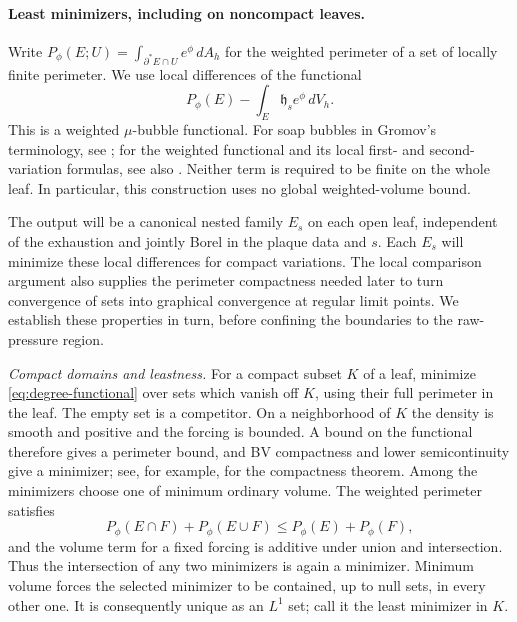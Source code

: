 \paragraph{Least minimizers, including on noncompact leaves.}
Write $P_\phi(E;U)=\int_{\partial^*E\cap U}e^\phi\,dA_h$ for the weighted
perimeter of a set of locally finite perimeter.  We use local differences
of the functional
\begin{equation}\label{eq:degree-functional}
                  P_\phi(E)-\int_E\mathfrak h_s e^\phi\,dV_h.
\end{equation}
This is a weighted $\mu$-bubble functional.  For soap bubbles in Gromov's
terminology, see \cite[Section~5$\frac56$]{Gromov1996}; for the weighted
functional and its local first- and second-variation formulas, see also
\cite[Section~3, Equation~(1), and Lemmas~13--14]{ChodoshLi2024}.
Neither term is required to be finite on the whole leaf.  In particular,
this construction uses no global weighted-volume bound.

The output will be a canonical nested family $E_s$ on each open leaf,
independent of the exhaustion and jointly Borel in the plaque data and
$s$.  Each $E_s$ will minimize these local differences for compact
variations.  The local comparison argument also supplies the perimeter
compactness needed later to turn convergence of sets into graphical
convergence at regular limit points.  We establish these properties in
turn, before confining the boundaries to the raw-pressure region.

\emph{Compact domains and leastness.}
For a compact subset $K$ of a leaf, minimize \eqref{eq:degree-functional}
over sets which vanish off $K$, using their full perimeter in the leaf.
The empty set is a competitor.  On a neighborhood of $K$ the density is
smooth and positive and the forcing is bounded.  A bound on the functional
therefore gives a perimeter bound, and BV compactness and lower
semicontinuity give a minimizer; see, for example,
\cite[Theorem~12.26]{Maggi2012} for the compactness theorem.  Among the
minimizers choose one of minimum
ordinary volume.  The weighted perimeter satisfies
\[
 P_\phi(E\cap F)+P_\phi(E\cup F)\le P_\phi(E)+P_\phi(F),
\]
and the volume term for a fixed forcing is additive under union and
intersection.  Thus the intersection of any two minimizers is again a
minimizer.  Minimum volume forces the selected minimizer to be contained,
up to null sets, in every other one.  It is consequently unique as an
$L^1$ set; call it the least minimizer in $K$.

